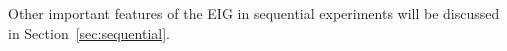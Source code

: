 \documentclass[a4paper, 10pt]{report}
\theoremstyle{plain}
\newtheorem{proposition}[theorem]{Proposition}
\begin{document}
	Other important features of the EIG in sequential experiments will be discussed in Section~\ref{sec:sequential}.
	
\end{document}

